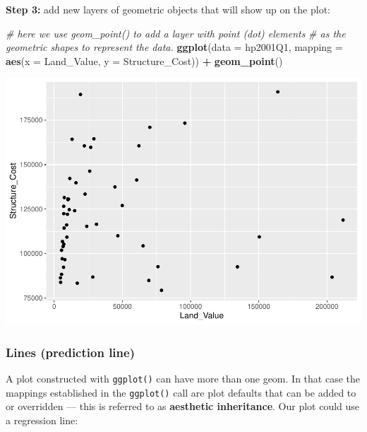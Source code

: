 \documentclass[
]{book}
\newenvironment{Shaded}{\begin{snugshade}}{\end{snugshade}}
\newcommand{\CommentTok}[1]{\textcolor[rgb]{0.56,0.35,0.01}{\textit{#1}}}
\newcommand{\DataTypeTok}[1]{\textcolor[rgb]{0.13,0.29,0.53}{#1}}
\newcommand{\KeywordTok}[1]{\textcolor[rgb]{0.13,0.29,0.53}{\textbf{#1}}}
\newcommand{\NormalTok}[1]{#1}
\newcommand{\OperatorTok}[1]{\textcolor[rgb]{0.81,0.36,0.00}{\textbf{#1}}}
\newcommand{\StringTok}[1]{\textcolor[rgb]{0.31,0.60,0.02}{#1}}
\begin{document}
\textbf{Step 3:} add new layers of geometric objects that will show up on the plot:

\begin{Shaded}
\begin{Highlighting}[]
\CommentTok{\# here we use geom\_point() to add a layer with point (dot) elements }
\CommentTok{\# as the geometric shapes to represent the data.}
\KeywordTok{ggplot}\NormalTok{(}\DataTypeTok{data =}\NormalTok{ hp2001Q1, }\DataTypeTok{mapping =} \KeywordTok{aes}\NormalTok{(}\DataTypeTok{x =}\NormalTok{ Land\_Value, }\DataTypeTok{y =}\NormalTok{ Structure\_Cost)) }\OperatorTok{+}
\StringTok{  }\KeywordTok{geom\_point}\NormalTok{()}
\end{Highlighting}
\end{Shaded}

\includegraphics{R/Rgraphics/figures/unnamed-chunk-159-1.pdf}

\hypertarget{lines-prediction-line}{%
\subsubsection{Lines (prediction line)}\label{lines-prediction-line}}

A plot constructed with \texttt{ggplot()} can have more than one geom. In that case the mappings established in the \texttt{ggplot()} call are plot defaults that can be added to or overridden --- this is referred to as \textbf{aesthetic inheritance}. Our plot could use a regression line:
\end{document}
